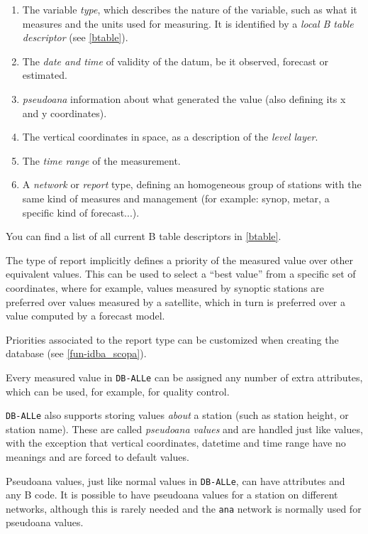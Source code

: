 \documentclass[final,12pt,a4paper,twoside]{book}
\newcommand{\dballe}{{\tt DB-ALLe}}
\begin{document}
\begin{enumerate}
\item The variable \emph{type}, which describes the nature of the
      variable, such as what it measures and the units used for measuring.
      It is identified by a \emph{local B table descriptor} (see \ref{btable}).
\item The \emph{date and time} of validity of the datum, be it observed,
      forecast or estimated.
\item \emph{pseudoana} information about what generated the value (also
      defining its x and y coordinates).
\item The vertical coordinates in space, as a description of the \emph{level layer}.
\item The \emph{time range} of the measurement.
\item A \emph{network} or \emph{report} type, defining an homogeneous group of
      stations with the same kind of measures and management (for example:
      synop, metar, a specific kind of forecast...).
\end{enumerate}

You can find a list of all current B table descriptors in \ref{btable}.

The type of report implicitly defines a priority of the measured value over
other equivalent values.  This can be used to select a ``best value'' from a
specific set of coordinates, where for example, values measured by synoptic
stations are preferred over values measured by a satellite, which in turn is
preferred over a value computed by a forecast model.

Priorities associated to the report type can be customized when creating the
database (see \ref{fun-idba_scopa}).

Every measured value in \dballe{} can be assigned any number of extra
attributes, which can be used, for example, for quality control.

\dballe{} also supports storing values \emph{about} a station (such as station
height, or station name).  These are called \emph{pseudoana values} and are
handled just like values, with the exception that vertical coordinates,
datetime and time range have no meanings and are forced to default values.

Pseudoana values, just like normal values in \dballe{}, can have attributes and
any B code.  It is possible to have pseudoana values for a station on different
networks, although this is rarely needed and the {\tt ana} network is normally
used for pseudoana values.
\end{document}

